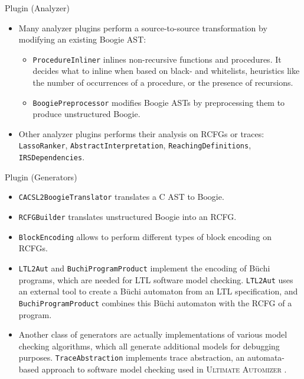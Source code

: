 \documentclass[12pt]{beamer}
\newcommand{\code}[1]{\texttt{#1}}
\newcommand{\ultimate}{\textsc{Ultimate }}
\newcommand{\automizer}{\textsc{Automizer }}
\begin{document}
\begin{frame}{Plugin (Analyzer)}
	\begin{itemize}
		\item Many analyzer plugins perform a source-to-source transformation by modifying an existing Boogie AST:
		\begin{itemize}
			\item \code{ProcedureInliner} inlines non-recursive functions and procedures. It decides what to inline when based on black- and whitelists, heuristics like the number of occurrences of a procedure, or the presence of recursions.
			\item \code{BoogiePreprocessor} modifies Boogie ASTs by preprocessing them to produce unstructured Boogie.
		\end{itemize}
		\item Other analyzer plugins performs their analysis on RCFGs or traces: \code{LassoRanker}, \code{AbstractInterpretation}, \code{ReachingDefinitions}, \code{IRSDependencies}.
	\end{itemize}
\end{frame}

\begin{frame}{Plugin (Generators)}
	\begin{itemize}
		\item \code{CACSL2BoogieTranslator} translates a C AST to Boogie.
		\item \code{RCFGBuilder} translates unstructured Boogie into an RCFG.
		\item \code{BlockEncoding} allows to perform different types of block encoding on RCFGs.
		\item \code{LTL2Aut} and \code{BuchiProgramProduct} implement the encoding of Büchi programs, which are needed for LTL software model checking. \code{LTL2Aut} uses an external tool to create a Büchi automaton from an LTL specification, and \code{BuchiProgramProduct} combines this Büchi automaton with the RCFG of a program.
		\item Another class of generators are actually implementations of various model checking algorithms, which all generate additional models for debugging purposes. \code{TraceAbstraction} implements trace abstraction, an automata-based approach to software model checking used in \ultimate \automizer.
	\end{itemize}
\end{frame}
\end{document}

